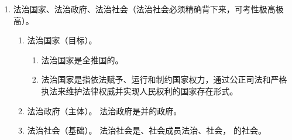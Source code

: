 \begin{enumerate}
\begin{enumerate}
\begin{enumerate}
                \end{enumerate}
          \item 法治国家、法治政府、法治社会（法治社会必须精确背下来，可考性极高极高）。
                \begin{enumerate}
                  \item 法治国家（目标）。
                        \begin{enumerate}
                          \item 法治国家是全推国的。
                          \item 法治国家是指依法赋予、运行和制约国家权力，通过公正司法和严格执法来维护法律权威并实现人民权利的国家存在形式。
                        \end{enumerate}
                  \item 法治政府（主体）。
                        法治政府是并的政府。
                  \item 法治社会（基础）。
                        法治社会是、社会成员法治、社会，
                        的社会。
                \end{enumerate}
        \end{enumerate}
\end{enumerate}